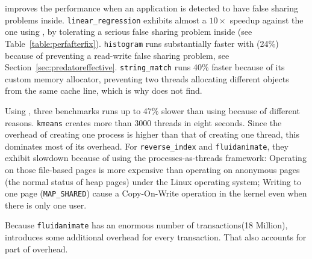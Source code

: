 \SheriffProtect{} improves the performance when an application is detected to have false sharing problems inside.  \texttt{linear\_regression} exhibits almost a $10\times$ speedup against the one using \pthreads{}, by tolerating a serious false sharing problem inside (see Table~\ref{table:perfafterfix}). \texttt{histogram} runs substantially faster with \SheriffProtect{} (24\%) because of preventing a read-write false sharing problem, see Section~\ref{sec:predatoreffective}. \texttt{string\_match} runs 40\% faster because of its custom memory allocator, preventing two threads allocating different objects from the same cache line, which is why \SheriffDetect{} does not find. 

Using \SheriffProtect{}, three benchmarks runs up to 47\% slower than using \pthreads{} because of different reasons. 
\texttt{kmeans} creates more than 3000 threads in eight seconds. Since the overhead of creating one process is higher than that of creating one thread, this dominates most of its overhead. For \texttt{reverse\_index} and \texttt{fluidanimate}, they exhibit slowdown because of using the processes-as-threads framework: Operating on those file-based pages is more expensive than operating on anonymous pages (the normal status of heap pages) under the Linux operating system; Writing to one page (\texttt{MAP\_SHARED}) cause a Copy-On-Write operation in the kernel even when there is only one user.  

Because \texttt{fluidanimate} has an enormous number of transactions(18 Million), \sheriffprotect{} 
introduces some additional overhead for every transaction. That also accounts for part of overhead.
